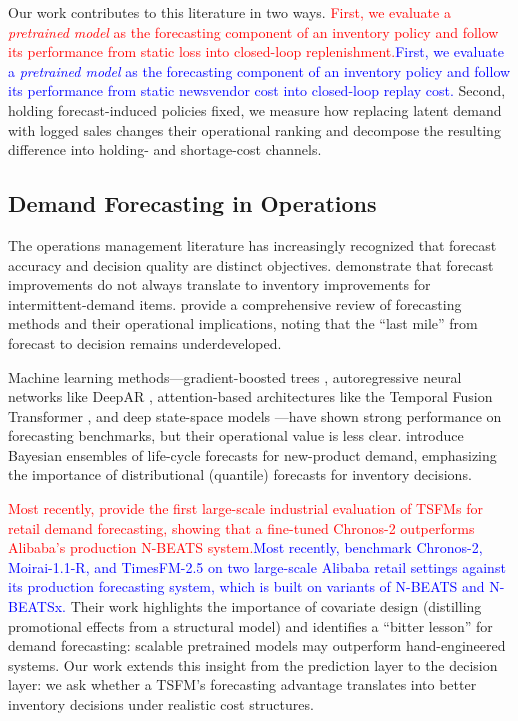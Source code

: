 \documentclass[msom,dblanonrev]{informs4}
\newcommand{\add}[1]{\textcolor{blue}{#1}}
\newcommand{\reduce}[1]{\textcolor{red}{#1}\hspace{0.5em}}
\begin{document}
Our work contributes to this literature in two ways.
\reduce{First, we evaluate a \emph{pretrained model} as the forecasting component of an inventory policy and follow its performance from static loss into closed-loop replenishment.}\add{First, we evaluate a \emph{pretrained model} as the forecasting component of an inventory policy and follow its performance from static newsvendor cost into closed-loop replay cost.}
Second, holding forecast-induced policies fixed, we measure how replacing latent demand with logged sales changes their operational ranking and decompose the resulting difference into holding- and shortage-cost channels.

\subsection{Demand Forecasting in Operations}

The operations management literature has increasingly recognized that forecast accuracy and decision quality are distinct objectives.
\citet{Syntetos2009} demonstrate that forecast improvements do not always translate to inventory improvements for intermittent-demand items.
\citet{PetropoulosEtAl2022} provide a comprehensive review of forecasting methods and their operational implications, noting that the ``last mile'' from forecast to decision remains underdeveloped.

Machine learning methods---gradient-boosted trees \citep{ChenGuestrin2016}, autoregressive neural networks like DeepAR \citep{Salinas2020DeepAR}, attention-based architectures like the Temporal Fusion Transformer \citep{LimEtAl2021}, and deep state-space models \citep{RangapuramEtAl2018}---have shown strong performance on forecasting benchmarks, but their operational value is less clear.
\citet{GuoEtAl2025} introduce Bayesian ensembles of life-cycle forecasts for new-product demand, emphasizing the importance of distributional (quantile) forecasts for inventory decisions.

\reduce{Most recently, \citet{SuiEtAl2026} provide the first large-scale industrial evaluation of TSFMs for retail demand forecasting, showing that a fine-tuned Chronos-2 outperforms Alibaba's production N-BEATS system.}\add{Most recently, \citet{SuiEtAl2026} benchmark Chronos-2, Moirai-1.1-R, and TimesFM-2.5 on two large-scale Alibaba retail settings against its production forecasting system, which is built on variants of N-BEATS and N-BEATSx.}
Their work highlights the importance of covariate design (distilling promotional effects from a structural model) and identifies a ``bitter lesson'' for demand forecasting: scalable pretrained models may outperform hand-engineered systems.
Our work extends this insight from the prediction layer to the decision layer: we ask whether a TSFM's forecasting advantage translates into better inventory decisions under realistic cost structures.
\end{document}
